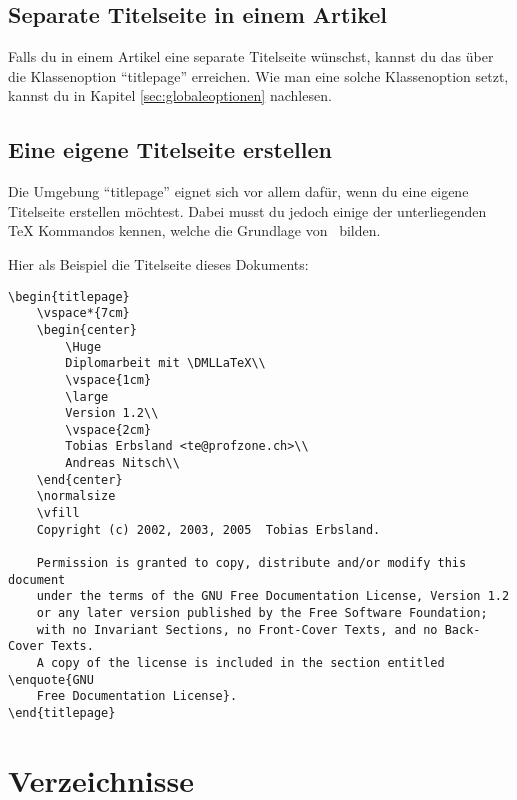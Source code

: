 \subsection{Separate Titelseite in einem Artikel}
\label{sec:separatetitelseite}

Falls du in einem Artikel eine separate Titelseite wünschst, kannst du das über die Klassenoption \enquote{titlepage} erreichen. Wie man eine solche Klassenoption setzt, kannst du in Kapitel \ref{sec:globaleoptionen} nachlesen.

\subsection{Eine eigene Titelseite erstellen}

Die Umgebung \enquote{titlepage} eignet sich vor allem dafür, wenn du eine eigene Titelseite erstellen möchtest. Dabei musst du jedoch einige der unterliegenden {\rmfamily\TeX} Kommandos kennen, welche die Grundlage von \DMLLaTeX \ bilden.

Hier als Beispiel die Titelseite dieses Dokuments:

\begin{lstlisting}[frame=tb, caption=Titelseite dieses Dokuments]
\begin{titlepage}
	\vspace*{7cm}
	\begin{center}
		\Huge
		Diplomarbeit mit \DMLLaTeX\\
		\vspace{1cm}
		\large
		Version 1.2\\
		\vspace{2cm}
		Tobias Erbsland <te@profzone.ch>\\
		Andreas Nitsch\\
	\end{center}
	\normalsize
	\vfill
	Copyright (c) 2002, 2003, 2005  Tobias Erbsland.

	Permission is granted to copy, distribute and/or modify this document
	under the terms of the GNU Free Documentation License, Version 1.2
	or any later version published by the Free Software Foundation;
	with no Invariant Sections, no Front-Cover Texts, and no Back-Cover Texts.
	A copy of the license is included in the section entitled \enquote{GNU
	Free Documentation License}.
\end{titlepage}
\end{lstlisting}

\section{Verzeichnisse}

